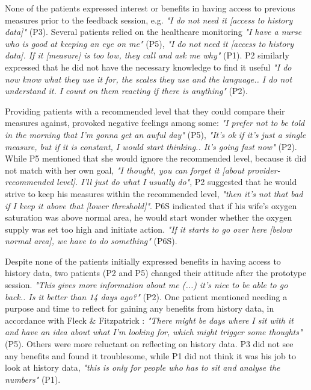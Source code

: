 None of the patients expressed interest or benefits in having access to previous measures prior to the feedback session, e.g. \textit{"I do not need it [access to history data]"} (P3). Several patients relied on the healthcare monitoring \textit{"I have a nurse who is good at keeping an eye on me"} (P5), \textit{"I do not need it [access to history data]. If it [measure] is too low, they call and ask me why"} (P1). P2 similarly expressed that he did not have the necessary knowledge to find it useful \textit{"I do now know what they use it for, the scales they use and the language.. I do not understand it. I count on them reacting if there is anything"} (P2).

Providing patients with a recommended level that they could compare their measures against, provoked negative feelings among some: \textit{"I prefer not to be told in the morning that I'm gonna get an awful day"} (P5), \textit{"It's ok if it's just a single measure, but if it is constant, I would start thinking.. It's going fast now"} (P2). While P5 mentioned that she would ignore the recommended level, because it did not match with her own goal, \textit{"I thought, you can forget it [about provider-recommended level]. I'll just do what I usually do"}, P2 suggested that he would strive to keep his measures within the recommended level, \textit{"then it's not that bad if I keep it above that [lower threshold]"}. P6S indicated that if his wife's oxygen saturation was above normal area, he would start wonder whether the oxygen supply was set too high and initiate action. \textit{"If it starts to go over here [below normal area], we have to do something"} (P6S).

Despite none of the patients initially expressed benefits in having access to history data, two patients (P2 and P5) changed their attitude after the prototype session. \textit{"This gives more information about me (...) it's nice to be able to go back.. Is it better than 14 days ago?"} (P2). One patient mentioned needing a purpose and time to reflect for gaining any benefits from history data, in accordance with Fleck \& Fitzpatrick \cite{Fleck}: \textit{"There might be days where I sit with it and have an idea about what I'm looking for, which might trigger some thoughts"} (P5). Others were more reluctant on reflecting on history data. P3 did not see any benefits and found it troublesome, while P1 did not think it was his job to look at history data, \textit{"this is only for people who has to sit and analyse the numbers"} (P1). 

